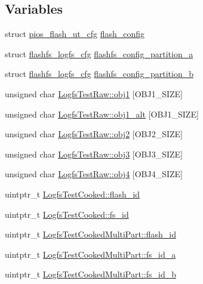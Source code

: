 \subsection*{\-Variables}
\begin{DoxyCompactItemize}
\item 
struct \hyperlink{structpios__flash__ut__cfg}{pios\-\_\-flash\-\_\-ut\-\_\-cfg} \hyperlink{group___unit_tests_gad0a2e88bcf286c1d92cc71ae4f2f4030}{flash\-\_\-config}
\item 
struct \hyperlink{structflashfs__logfs__cfg}{flashfs\-\_\-logfs\-\_\-cfg} \hyperlink{group___unit_tests_gaba5cc3d568259a61d596b4cd0c63bad8}{flashfs\-\_\-config\-\_\-partition\-\_\-a}
\item 
struct \hyperlink{structflashfs__logfs__cfg}{flashfs\-\_\-logfs\-\_\-cfg} \hyperlink{group___unit_tests_ga6d0bc62b8797aa4539687ed6b976e503}{flashfs\-\_\-config\-\_\-partition\-\_\-b}
\item 
unsigned char \hyperlink{group___unit_tests_ga9a310807ae65fdb582ace246798d9112}{\-Logfs\-Test\-Raw\-::obj1} \mbox{[}\-O\-B\-J1\-\_\-\-S\-I\-Z\-E\mbox{]}
\item 
unsigned char \hyperlink{group___unit_tests_gab4d553b9c4a87a6f45e032b57f98a751}{\-Logfs\-Test\-Raw\-::obj1\-\_\-alt} \mbox{[}\-O\-B\-J1\-\_\-\-S\-I\-Z\-E\mbox{]}
\item 
unsigned char \hyperlink{group___unit_tests_ga8ed143a62924cbb11a0150f51b0f39e9}{\-Logfs\-Test\-Raw\-::obj2} \mbox{[}\-O\-B\-J2\-\_\-\-S\-I\-Z\-E\mbox{]}
\item 
unsigned char \hyperlink{group___unit_tests_gae2971f4ef641d737044260c4f11c1ba0}{\-Logfs\-Test\-Raw\-::obj3} \mbox{[}\-O\-B\-J3\-\_\-\-S\-I\-Z\-E\mbox{]}
\item 
unsigned char \hyperlink{group___unit_tests_ga538292c7d3fd8ffe5a32cc8b7e43d51c}{\-Logfs\-Test\-Raw\-::obj4} \mbox{[}\-O\-B\-J4\-\_\-\-S\-I\-Z\-E\mbox{]}
\item 
uintptr\-\_\-t \hyperlink{group___unit_tests_ga1180d0088fd85cca978eaed59163f626}{\-Logfs\-Test\-Cooked\-::flash\-\_\-id}
\item 
uintptr\-\_\-t \hyperlink{group___unit_tests_gaa47f085754c3a15dd69bcfbde0d804d7}{\-Logfs\-Test\-Cooked\-::fs\-\_\-id}
\item 
uintptr\-\_\-t \hyperlink{group___unit_tests_ga503c4ee9ad8abab85d6fb34d0397944c}{\-Logfs\-Test\-Cooked\-Multi\-Part\-::flash\-\_\-id}
\item 
uintptr\-\_\-t \hyperlink{group___unit_tests_gadeab2644468b89d495d396f0e55524e6}{\-Logfs\-Test\-Cooked\-Multi\-Part\-::fs\-\_\-id\-\_\-a}
\item 
uintptr\-\_\-t \hyperlink{group___unit_tests_ga2398cf58e337f70603e12a997936f0c9}{\-Logfs\-Test\-Cooked\-Multi\-Part\-::fs\-\_\-id\-\_\-b}
\end{DoxyCompactItemize}


